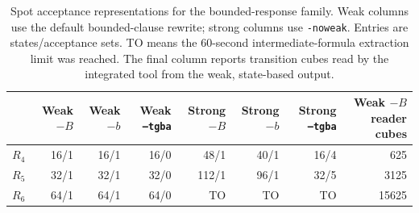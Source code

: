 \begin{table}[t]
\centering
\caption{Spot acceptance representations for the bounded-response family. Weak columns use the default bounded-clause rewrite; strong columns use \texttt{-noweak}. Entries are states/acceptance sets. TO means the 60-second intermediate-formula extraction limit was reached. The final column reports transition cubes read by the integrated tool from the weak, state-based output.}
\label{tab:acceptance-modes}
\footnotesize
\begin{tabular}{@{}lrrrrrrr@{}}
\toprule
 & Weak $-B$ & Weak $-b$ & Weak \texttt{--tgba} & Strong $-B$ & Strong $-b$ & Strong \texttt{--tgba} & \shortstack{Weak $-B$\\reader cubes}\\
\midrule
$R_{4}$ & 16/1 & 16/1 & 16/0 & 48/1 & 40/1 & 16/4 & 625\\
$R_{5}$ & 32/1 & 32/1 & 32/0 & 112/1 & 96/1 & 32/5 & 3125\\
$R_{6}$ & 64/1 & 64/1 & 64/0 & TO & TO & TO & 15625\\
\bottomrule
\end{tabular}
\end{table}
